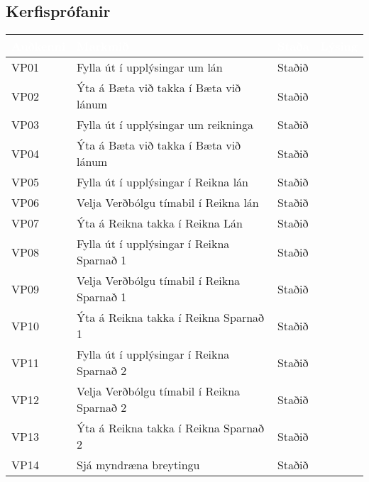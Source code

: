 \documentclass[a4paper,10pt]{article}
\begin{document}
\subsection{Kerfisprófanir}
\begin{center}
    \begin{tabular}{| l | p{6cm} | l | l |}
    \hline
    \rowcolor{LightBlue!65}
     \textcolor{White}{Auðkenni} & \textcolor{White}{Markmið} & \textcolor{White}{Staða} & \textcolor{White}{Lýsing} \\ 
     \hline
     \hline
    \rowcolor{LightCol!30}
    VP01 & Fylla út í upplýsingar um lán & Staðið & \\ \hline
    VP02 & Ýta á Bæta við takka í Bæta við lánum & Staðið & \\ \hline
    \rowcolor{LightCol!30}
    VP03 & Fylla út í upplýsingar um reikninga & Staðið & \\ \hline
    VP04 & Ýta á Bæta við takka í Bæta við lánum & Staðið & \\ \hline
    \rowcolor{LightCol!30}
    VP05 & Fylla út í upplýsingar í Reikna lán & Staðið & \\ \hline
    VP06 & Velja Verðbólgu tímabil í Reikna lán & Staðið & \\ \hline
    \rowcolor{LightCol!30}
    VP07 & Ýta á Reikna takka í Reikna Lán & Staðið & \\ \hline
    VP08 & Fylla út í upplýsingar í Reikna Sparnað 1& Staðið & \\ \hline
    \rowcolor{LightCol!30}
    VP09 & Velja Verðbólgu tímabil í Reikna Sparnað 1 & Staðið & \\ \hline
    VP10 & Ýta á Reikna takka í Reikna Sparnað 1 & Staðið & \\ \hline
    \rowcolor{LightCol!30}
    VP11 & Fylla út í upplýsingar í Reikna Sparnað 2& Staðið & \\ \hline
    VP12 & Velja Verðbólgu tímabil í Reikna Sparnað 2 & Staðið & \\ \hline
    \rowcolor{LightCol!30}
    VP13 & Ýta á Reikna takka í Reikna Sparnað 2 & Staðið & \\ \hline
    VP14 & Sjá myndræna breytingu & Staðið & \\ \hline    
    \end{tabular}
\end{center}
\end{document}
